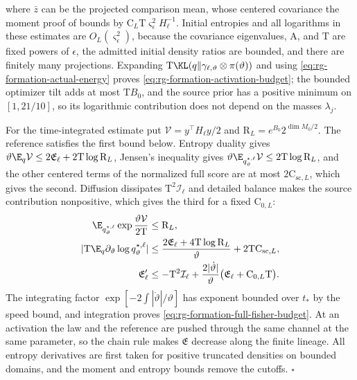 where \(\bar z\) can be the projected comparison mean, whose centered
covariance the moment proof of 
bounds by \(\mathrm C_L\mathrm T\varsigma_\epsilon^2H_\ell^{-1}\). Initial
entropies and all logarithms in these estimates are
\(O_L(\varsigma_\epsilon^2)\), because the covariance eigenvalues, \(\mathrm A\),
and \(\mathrm T\) are fixed powers of \(\epsilon\), the admitted initial density
ratios are bounded, and there are finitely many projections. Expanding
\(\mathrm T\KL(q\Vert\gamma_{\ell,\vartheta}\otimes\pi(\vartheta))\) and using
\cref{eq:rg-formation-actual-energy} proves
\cref{eq:rg-formation-activation-budget}; the bounded optimizer tilt adds at
most \(\mathrm TB_0\), and the source prior has a positive minimum on
\([1,21/10]\), so its logarithmic contribution does not depend on the masses
\(\lambda_j\).

For the time-integrated estimate put \(\mathcal V=y^\top H_\ell y/2\) and
\(\mathrm R_L=e^{B_0}2^{\dim M_0/2}\). The reference satisfies the first bound
below. Entropy duality gives
\(\vartheta\E_q\mathcal V\le2\mathfrak E_\ell+2\mathrm T\log\mathrm R_L\),
Jensen's inequality gives
\(\vartheta\E_{q^{\star,\ell}_\vartheta}\mathcal V\le2\mathrm T\log\mathrm R_L\),
and the other centered terms of the normalized full score are at most
\(2\mathrm C_{\mathrm{sc},L}\), which gives the second. Diffusion dissipates
\(\mathrm T^2\mathcal I_\ell\) and detailed balance makes the source
contribution nonpositive, which gives the third for a fixed
\(\mathrm C_{0,L}\):
\begin{align}
 \E_{q^{\star,\ell}_\vartheta}\exp\frac{\vartheta\mathcal V}{2\mathrm T}
 &\le \mathrm R_L,
 \label{eq:rg-formation-energy-exponential-moment}\\
 |\mathrm T\E_q\partial_\vartheta\log q^{\star,\ell}_\vartheta|
 &\le\frac{2\mathfrak E_\ell+4\mathrm T\log\mathrm R_L}{\vartheta}+2\mathrm T\mathrm C_{\mathrm{sc},L},
 \label{eq:rg-formation-entropy-parameter-budget}\\
 \mathfrak E_\ell'&\le -\mathrm T^2\mathcal I_\ell+
    \frac{2|\dot\vartheta|}{\vartheta}\bigl(\mathfrak E_\ell+\mathrm C_{0,L}\mathrm T\bigr).
 \label{eq:rg-formation-entropy-energy-inequality}
\end{align}
The integrating factor \(\exp[-2\int|\dot\vartheta|/\vartheta]\) has exponent
bounded over \(t_*\) by the speed bound, and integration proves
\cref{eq:rg-formation-full-fisher-budget}. At an activation the law and the
reference are pushed through the same channel at the same parameter, so the
chain rule makes \(\mathfrak E\) decrease along the finite lineage. All
entropy derivatives are first taken for positive truncated densities on
bounded domains, and the moment and entropy bounds remove the cutoffs.
\hfill\(\square\)

